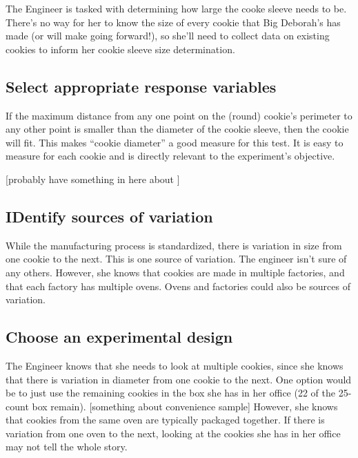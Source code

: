 \documentclass[
]{book}
\theoremstyle{definition}
\theoremstyle{definition}
\theoremstyle{definition}
\theoremstyle{remark}
\begin{document}
The Engineer is tasked with determining how large the cooke sleeve needs to be. There's no way for her to know the size of every cookie that Big Deborah's has made (or will make going forward!), so she'll need to collect data on existing cookies to inform her cookie sleeve size determination.

\hypertarget{select-appropriate-response-variables}{%
\subsection{Select appropriate response variables}\label{select-appropriate-response-variables}}

If the maximum distance from any one point on the (round) cookie's perimeter to any other point is smaller than the diameter of the cookie sleeve, then the cookie will fit. This makes ``cookie diameter'' a good measure for this test. It is easy to measure for each cookie and is directly relevant to the experiment's objective.

{[}probably have something in here about {]}

\hypertarget{identify-sources-of-variation}{%
\subsection{IDentify sources of variation}\label{identify-sources-of-variation}}

While the manufacturing process is standardized, there is variation in size from one cookie to the next. This is one source of variation. The engineer isn't sure of any others. However, she knows that cookies are made in multiple factories, and that each factory has multiple ovens. Ovens and factories could also be sources of variation.

\hypertarget{choose-an-experimental-design-2}{%
\subsection{Choose an experimental design}\label{choose-an-experimental-design-2}}

The Engineer knows that she needs to look at multiple cookies, since she knows that there is variation in diameter from one cookie to the next. One option would be to just use the remaining cookies in the box she has in her office (22 of the 25-count box remain). {[}something about convenience sample{]} However, she knows that cookies from the same oven are typically packaged together. If there is variation from one oven to the next, looking at the cookies she has in her office may not tell the whole story.
\end{document}
